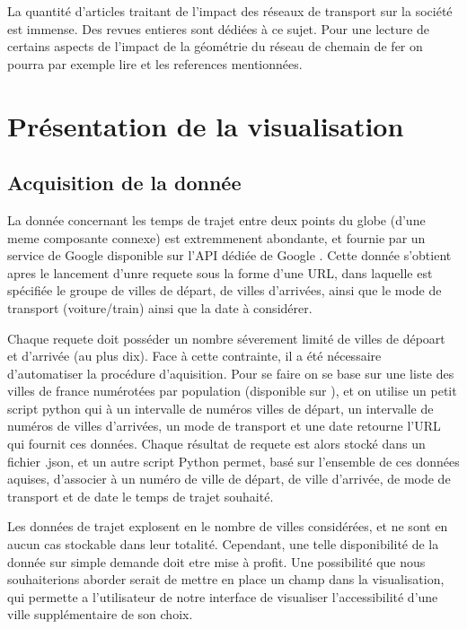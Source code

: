 \documentclass{vgtc}                          %
\begin{document}
La quantité d'articles traitant de l'impact des réseaux de transport sur la société est immense. Des revues entieres sont dédiées à ce sujet. Pour une lecture de certains aspects de l'impact de la géométrie du réseau de chemain de fer on pourra par exemple lire \cite{cao2017investigating} et les references mentionnées.


\section{Présentation de la visualisation}

\vspace{0.3cm}

\subsection{Acquisition de la donnée}

\vspace{0.3cm}

La donnée concernant les temps de trajet entre deux points du globe (d'une meme composante connexe) est extremmenent abondante, et fournie par un service de Google disponible sur l'API dédiée de Google \cite{APIGoogle}. Cette donnée s'obtient apres le lancement d'unre requete sous la forme d'une URL, dans laquelle est spécifiée le groupe de villes de départ, de villes d'arrivées, ainsi que le mode de transport (voiture/train) ainsi que la date à considérer. 

Chaque requete doit posséder un nombre séverement limité de villes de dépoart et d'arrivée (au plus dix). Face à cette contrainte, il a été nécessaire d'automatiser la procédure d'aquisition. Pour se faire on se base sur une liste des villes de france numérotées par population (disponible sur ), et on utilise un petit script python qui à un intervalle de numéros villes de départ, un intervalle de numéros de villes d'arrivées, un mode de transport et une date retourne l'URL qui fournit ces données. Chaque résultat de requete est alors stocké dans un fichier .json, et un autre script Python permet, basé sur l'ensemble de ces données aquises, d'associer à un numéro de ville de départ, de ville d'arrivée, de mode de transport et de date le temps de trajet souhaité. 

Les données de trajet explosent en le nombre de villes considérées, et ne sont en aucun cas stockable dans leur totalité. Cependant, une telle disponibilité de la donnée sur simple demande doit etre mise à profit. Une possibilité que nous souhaiterions aborder serait de mettre en place un champ dans la visualisation, qui permette a l'utilisateur de notre interface de visualiser l'accessibilité d'une ville supplémentaire de son choix.
\end{document}
